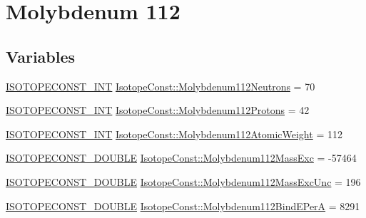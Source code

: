 \hypertarget{group___isotope_const-_molybdenum-_mo112}{}\section{Molybdenum 112}
\label{group___isotope_const-_molybdenum-_mo112}
\subsection*{Variables}
\begin{DoxyCompactItemize}
\item 
\mbox{\hyperlink{group___isotope_const-_macros_ga5f18360b3e99483a35c32d789e62621c}{I\+S\+O\+T\+O\+P\+E\+C\+O\+N\+S\+T\+\_\+\+I\+NT}} \mbox{\hyperlink{group___isotope_const-_molybdenum-_mo112_ga7377770d1130c20cd087e460c3e79240}{Isotope\+Const\+::\+Molybdenum112\+Neutrons}} = 70
\item 
\mbox{\hyperlink{group___isotope_const-_macros_ga5f18360b3e99483a35c32d789e62621c}{I\+S\+O\+T\+O\+P\+E\+C\+O\+N\+S\+T\+\_\+\+I\+NT}} \mbox{\hyperlink{group___isotope_const-_molybdenum-_mo112_ga8cf0a2b3b7c958939ceaef2fd0da1404}{Isotope\+Const\+::\+Molybdenum112\+Protons}} = 42
\item 
\mbox{\hyperlink{group___isotope_const-_macros_ga5f18360b3e99483a35c32d789e62621c}{I\+S\+O\+T\+O\+P\+E\+C\+O\+N\+S\+T\+\_\+\+I\+NT}} \mbox{\hyperlink{group___isotope_const-_molybdenum-_mo112_ga64045e0258c73c0d315f91cacb78ed57}{Isotope\+Const\+::\+Molybdenum112\+Atomic\+Weight}} = 112
\item 
\mbox{\hyperlink{group___isotope_const-_macros_ga8f45a7272ce02c0b4c65c44636ed719a}{I\+S\+O\+T\+O\+P\+E\+C\+O\+N\+S\+T\+\_\+\+D\+O\+U\+B\+LE}} \mbox{\hyperlink{group___isotope_const-_molybdenum-_mo112_gad7d3bac05bf3c8750a58a16535177725}{Isotope\+Const\+::\+Molybdenum112\+Mass\+Exc}} = -\/57464
\item 
\mbox{\hyperlink{group___isotope_const-_macros_ga8f45a7272ce02c0b4c65c44636ed719a}{I\+S\+O\+T\+O\+P\+E\+C\+O\+N\+S\+T\+\_\+\+D\+O\+U\+B\+LE}} \mbox{\hyperlink{group___isotope_const-_molybdenum-_mo112_gab8663ca6f43a5a19ab38d37625e9462f}{Isotope\+Const\+::\+Molybdenum112\+Mass\+Exc\+Unc}} = 196
\item 
\mbox{\hyperlink{group___isotope_const-_macros_ga8f45a7272ce02c0b4c65c44636ed719a}{I\+S\+O\+T\+O\+P\+E\+C\+O\+N\+S\+T\+\_\+\+D\+O\+U\+B\+LE}} \mbox{\hyperlink{group___isotope_const-_molybdenum-_mo112_ga671c20afe9e73bebfdb7e2018c023f44}{Isotope\+Const\+::\+Molybdenum112\+Bind\+E\+PerA}} = 8291
\item 

\end{DoxyCompactItemize}
